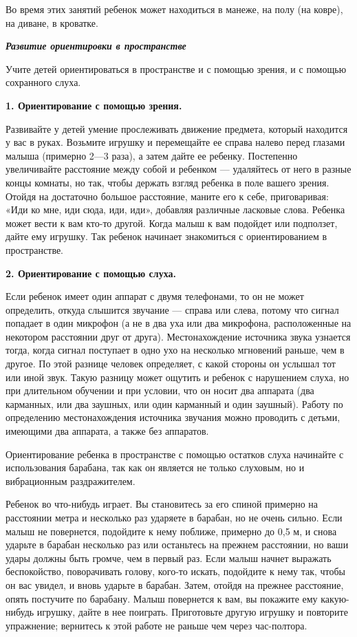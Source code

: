 \documentclass{book}
\renewcommand{\emph}[1]{\textit{#1}}
\begin{document}
Во время этих занятий ребенок может находиться в манеже, на полу (на
ковре), на диване, в кроватке.

\emph{\textbf{Развитие ориентировки в пространстве}}

Учите детей ориентироваться в пространстве и с помощью зрения, и с
помощью сохранного слуха.

\textbf{1. Ориентирование с помощью зрения.}

Развивайте у детей умение прослеживать движение предмета, который
находится у вас в руках. Возьмите игрушку и перемещайте ее справа налево
перед глазами малыша (примерно 2---3 раза), а затем дайте ее ребенку.
Постепенно увеличивайте расстояние между собой и ребенком --- удаляйтесь
от него в разные концы комнаты, но так, чтобы держать взгляд ребенка в
поле вашего зрения. Отойдя на достаточно большое расстояние, маните его
к себе, приговаривая: «Иди ко мне, иди сюда, иди, иди», добавляя
различные ласковые слова. Ребенка может вести к вам кто-то другой. Когда
малыш к вам подойдет или подползет, дайте ему игрушку. Так ребенок
начинает знакомиться с ориентированием в пространстве.

\textbf{2. Ориентирование с помощью слуха.}

Если ребенок имеет один аппарат с двумя телефонами, то он не может
определить, откуда слышится звучание --- справа или слева, потому что
сигнал попадает в один микрофон (а не в два уха или два микрофона,
расположенные на некотором расстоянии друг от друга). Местонахождение
источника звука узнается тогда, когда сигнал поступает в одно ухо на
несколько мгновений раньше, чем в другое. По этой разнице человек
определяет, с какой стороны он услышал тот или иной звук. Такую разницу
может ощутить и ребенок с нарушением слуха, но при длительном обучении и
при условии, что он носит два аппарата (два карманных, или два заушных,
или один карманный и один заушный). Работу по определению
местонахождения источника звучания можно проводить с детьми, имеющими
два аппарата, а также без аппаратов.

Ориентирование ребенка в пространстве с помощью остатков слуха начинайте
с использования барабана, так как он является не только слуховым, но и
вибрационным раздражителем.

Ребенок во что-нибудь играет. Вы становитесь за его спиной примерно на
расстоянии метра и несколько раз ударяете в барабан, но не очень сильно.
Если малыш не повернется, подойдите к нему поближе, примерно до 0,5 м, и
снова ударьте в барабан несколько раз или останьтесь на прежнем
расстоянии, но ваши удары должны быть громче, чем в первый раз. Если
малыш начнет выражать беспокойство, поворачивать голову, кого-то искать,
подойдите к нему так, чтобы он вас увидел, и вновь ударьте в барабан.
Затем, отойдя на прежнее расстояние, опять постучите по барабану. Малыш
повернется к вам, вы покажите ему какую-нибудь игрушку, дайте в нее
поиграть. Приготовьте другую игрушку и повторите упражнение; вернитесь к
этой работе не раньше чем через час-полтора.
\end{document}

